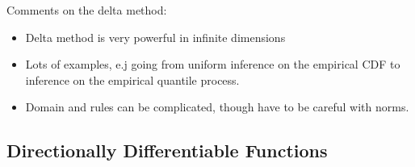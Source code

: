 \begin{remark*} Comments on the delta method:
	\begin{itemize}
		\item Delta method is very powerful in infinite dimensions
		\item Lots of examples, e.j going from uniform inference on the empirical CDF to inference on the empirical quantile process.
		\item Domain and rules can be complicated, though have to be careful with norms.
	\end{itemize}
\end{remark*}

\subsection{Directionally Differentiable Functions}%
\label{subsec:directionally-differentiable}

